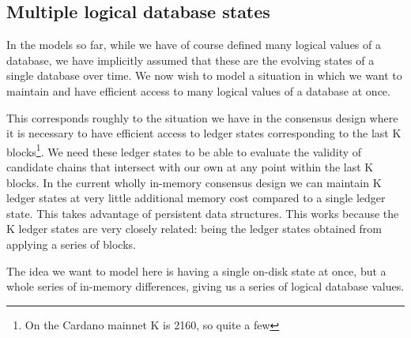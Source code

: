 \documentclass[11pt,a4paper]{article}
\begin{document}
\subsection{Multiple logical database states}

In the models so far, while we have of course defined many logical values of
a database, we have implicitly assumed that these are the evolving states of
a single database over time. We now wish to model a situation in which we want
to maintain and have efficient access to many logical values of a database at
once.

This corresponds roughly to the situation we have in the consensus design where
it is necessary to have efficient access to ledger states corresponding to the
last K blocks\footnote{On the Cardano mainnet K is 2160, so quite a few}. We
need these ledger states to be able to evaluate the validity of candidate
chains that intersect with our own at any point within the last K blocks. In
the current wholly in-memory consensus design we can maintain K ledger states
at very little additional memory cost compared to a single ledger state. This
takes advantage of persistent data structures. This works because the K ledger
states are very closely related: being the ledger states obtained from applying
a series of blocks.

The idea we want to model here is having a single on-disk state at once, but
a whole series of in-memory differences, giving us a series of logical database
values.
\end{document}
